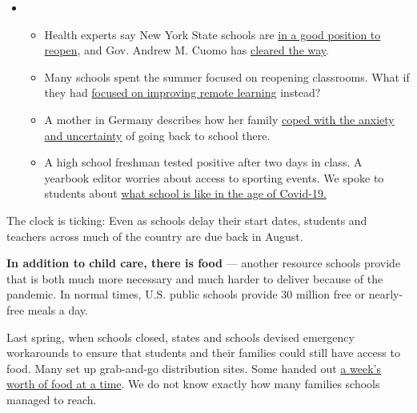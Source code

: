 \begin{itemize}
\item
  \begin{itemize}
  \tightlist
  \item
    Health experts say New York State schools are
    \href{https://www.nytimes.com/2020/08/07/health/coronavirus-ny-schools-reopen.html?action=click\&pgtype=Article\&state=default\&region=MAIN_CONTENT_2\&context=storylines_keepup}{in
    a good position to reopen}, and Gov. Andrew M. Cuomo has
    \href{https://www.nytimes.com/2020/08/07/nyregion/cuomo-schools-reopening.html?action=click\&pgtype=Article\&state=default\&region=MAIN_CONTENT_2\&context=storylines_keepup}{cleared
    the way}.
  \item
    Many schools spent the summer focused on reopening classrooms. What
    if they had
    \href{https://www.nytimes.com/2020/08/07/us/remote-learning-fall-2020.html?action=click\&pgtype=Article\&state=default\&region=MAIN_CONTENT_2\&context=storylines_keepup}{focused
    on improving remote learning} instead?
  \item
    A mother in Germany describes how her family
    \href{https://www.nytimes.com/2020/08/07/parenting/germany-schools-reopening-children.html?action=click\&pgtype=Article\&state=default\&region=MAIN_CONTENT_2\&context=storylines_keepup}{coped
    with the anxiety and uncertainty} of going back to school there.
  \item
    A high school freshman tested positive after two days in class. A
    yearbook editor worries about access to sporting events. We spoke to
    students about
    \href{https://www.nytimes.com/2020/08/06/us/coronavirus-students.html?action=click\&pgtype=Article\&state=default\&region=MAIN_CONTENT_2\&context=storylines_keepup}{what
    school is like in the age of Covid-19.}
  \end{itemize}
\end{itemize}

The clock is ticking: Even as schools delay their start dates, students
and teachers across much of the country are due back in August.

\textbf{In addition to child care, there is food} --- another resource
schools provide that is both much more necessary and much harder to
deliver because of the pandemic. In normal times, U.S. public schools
provide 30 million free or nearly-free meals a day.

Last spring, when schools closed, states and schools devised emergency
workarounds to ensure that students and their families could still have
access to food. Many set up grab-and-go distribution sites. Some handed
out
\href{https://in.chalkbeat.org/2020/6/25/21303626/indianas-summer-food-program-expands-to-meet-increased-needs-during-the-coronavirus-covid19-pandemic}{a
week's worth of food at a time}. We do not know exactly how many
families schools managed to reach.

